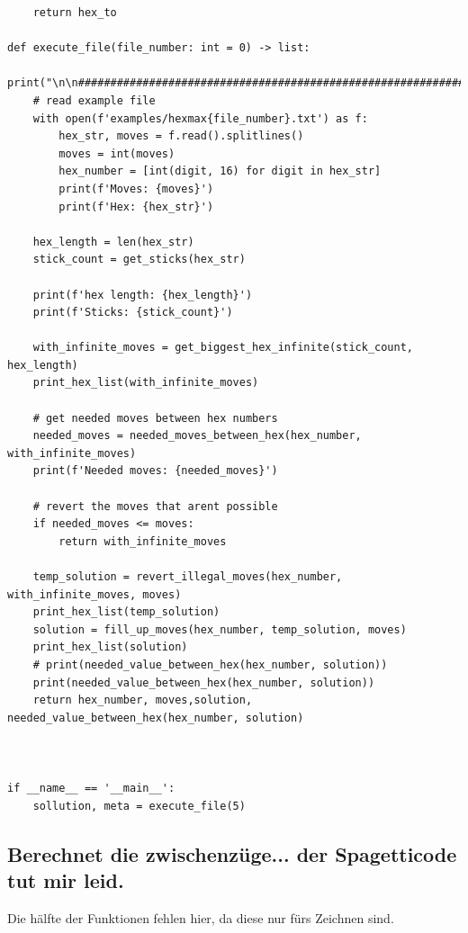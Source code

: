 \documentclass[a4paper,10pt,ngerman]{scrartcl}
\begin{document}
\begin{lstlisting}
    return hex_to

def execute_file(file_number: int = 0) -> list:
    print("\n\n#############################################################################################################################################")
    # read example file
    with open(f'examples/hexmax{file_number}.txt') as f:
        hex_str, moves = f.read().splitlines()
        moves = int(moves)
        hex_number = [int(digit, 16) for digit in hex_str]
        print(f'Moves: {moves}')
        print(f'Hex: {hex_str}')

    hex_length = len(hex_str)
    stick_count = get_sticks(hex_str)

    print(f'hex length: {hex_length}')
    print(f'Sticks: {stick_count}')

    with_infinite_moves = get_biggest_hex_infinite(stick_count, hex_length)
    print_hex_list(with_infinite_moves)

    # get needed moves between hex numbers
    needed_moves = needed_moves_between_hex(hex_number, with_infinite_moves)
    print(f'Needed moves: {needed_moves}')

    # revert the moves that arent possible
    if needed_moves <= moves:
        return with_infinite_moves

    temp_solution = revert_illegal_moves(hex_number, with_infinite_moves, moves)
    print_hex_list(temp_solution)
    solution = fill_up_moves(hex_number, temp_solution, moves)
    print_hex_list(solution)
    # print(needed_value_between_hex(hex_number, solution))
    print(needed_value_between_hex(hex_number, solution))
    return hex_number, moves,solution, needed_value_between_hex(hex_number, solution)



if __name__ == '__main__':
    sollution, meta = execute_file(5)
\end{lstlisting}	

\subsection{Berechnet die zwischenzüge... der Spagetticode tut mir leid.}

Die hälfte der Funktionen fehlen hier, da diese nur fürs Zeichnen sind.
\end{document}
